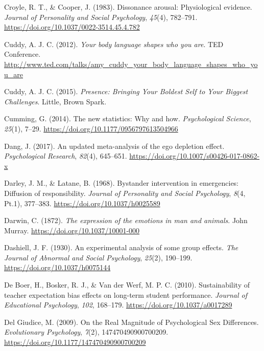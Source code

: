 \documentclass[
  letterpaper,
]{book}
\newlength{\cslhangindent}
\newenvironment{CSLReferences}[2] %
 {\begin{list}{}{%
  \setlength{\itemindent}{0pt}
  \setlength{\leftmargin}{0pt}
  \setlength{\parsep}{0pt}
  \ifodd #1
   \setlength{\leftmargin}{\cslhangindent}
   \setlength{\itemindent}{-1\cslhangindent}
  \fi
  \setlength{\itemsep}{#2\baselineskip}}}
 {\end{list}}
\begin{document}
\begin{CSLReferences}{1}{0}
Croyle, R. T., \& Cooper, J. (1983). Dissonance arousal: Physiological
evidence. \emph{Journal of Personality and Social Psychology},
\emph{45}(4), 782--791. \url{https://doi.org/10.1037/0022-3514.45.4.782}

Cuddy, A. J. C. (2012). \emph{Your body language shapes who you are}.
TED Conference.
\url{http://www.ted.com/talks/amy_cuddy_your_body_language_shapes_who_you_are}

Cuddy, A. J. C. (2015). \emph{Presence: {Bringing} {Your} {Boldest}
{Self} to {Your} {Biggest} {Challenges}}. Little, Brown Spark.

Cumming, G. (2014). The new statistics: Why and how. \emph{Psychological
Science}, \emph{25}(1), 7--29.
\url{https://doi.org/10.1177/0956797613504966}

Dang, J. (2017). An updated meta-analysis of the ego depletion effect.
\emph{Psychological Research}, \emph{82}(4), 645--651.
\url{https://doi.org/10.1007/s00426-017-0862-x}

Darley, J. M., \& Latane, B. (1968). Bystander intervention in
emergencies: {Diffusion} of responsibility. \emph{Journal of Personality
and Social Psychology}, \emph{8}(4, Pt.1), 377--383.
\url{https://doi.org/10.1037/h0025589}

Darwin, C. (1872). \emph{The expression of the emotions in man and
animals}. John Murray. \url{https://doi.org/10.1037/10001-000}

Dashiell, J. F. (1930). An experimental analysis of some group effects.
\emph{The Journal of Abnormal and Social Psychology}, \emph{25}(2),
190--199. \url{https://doi.org/10.1037/h0075144}

De Boer, H., Bosker, R. J., \& Van der Werf, M. P. C. (2010).
Sustainability of teacher expectation bias effects on long-term student
performance. \emph{Journal of Educational Psychology}, \emph{102},
168--179. \url{https://doi.org/10.1037/a0017289}

Del Giudice, M. (2009). On the {Real} {Magnitude} of {Psychological}
{Sex} {Differences}. \emph{Evolutionary Psychology}, \emph{7}(2),
147470490900700209. \url{https://doi.org/10.1177/147470490900700209}


\end{CSLReferences}
\end{document}

